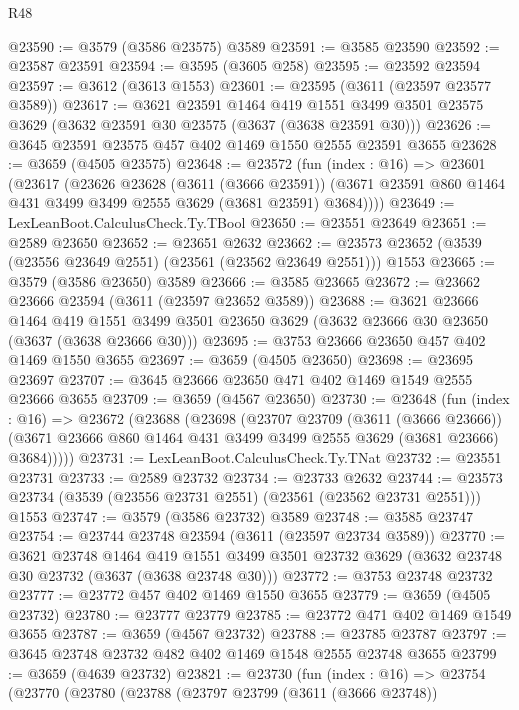 \begin{lexlean}{R48}
\begin{coremodule}
@23590 := @3579 (@3586 @23575) @3589
@23591 := @3585 @23590
@23592 := @23587 @23591
@23594 := @3595 (@3605 @258)
@23595 := @23592 @23594
@23597 := @3612 (@3613 @1553)
@23601 := @23595 (@3611 (@23597 @23577 @3589))
@23617 := @3621
    @23591
    @1464
    @419
    @1551
    @3499
    @3501
    @23575
    @3629
    (@3632 @23591 @30 @23575 (@3637 (@3638 @23591 @30)))
@23626 := @3645 @23591 @23575 @457 @402 @1469 @1550 @2555 @23591 @3655
@23628 := @3659 (@4505 @23575)
@23648 := @23572
    (fun (index : @16) =>
    @23601
      (@23617
        (@23626
          @23628
          (@3611 (@3666 @23591))
          (@3671 @23591 @860 @1464 @431 @3499 @3499 @2555 @3629 (@3681 @23591) @3684))))
@23649 := LexLeanBoot.CalculusCheck.Ty.TBool
@23650 := @23551 @23649
@23651 := @2589 @23650
@23652 := @23651 @2632
@23662 := @23573 @23652 (@3539 (@23556 @23649 @2551) (@23561 (@23562 @23649 @2551))) @1553
@23665 := @3579 (@3586 @23650) @3589
@23666 := @3585 @23665
@23672 := @23662 @23666 @23594 (@3611 (@23597 @23652 @3589))
@23688 := @3621
    @23666
    @1464
    @419
    @1551
    @3499
    @3501
    @23650
    @3629
    (@3632 @23666 @30 @23650 (@3637 (@3638 @23666 @30)))
@23695 := @3753 @23666 @23650 @457 @402 @1469 @1550 @3655
@23697 := @3659 (@4505 @23650)
@23698 := @23695 @23697
@23707 := @3645 @23666 @23650 @471 @402 @1469 @1549 @2555 @23666 @3655
@23709 := @3659 (@4567 @23650)
@23730 := @23648
    (fun (index : @16) =>
    @23672
      (@23688
        (@23698
          (@23707
            @23709
            (@3611 (@3666 @23666))
            (@3671 @23666 @860 @1464 @431 @3499 @3499 @2555 @3629 (@3681 @23666) @3684)))))
@23731 := LexLeanBoot.CalculusCheck.Ty.TNat
@23732 := @23551 @23731
@23733 := @2589 @23732
@23734 := @23733 @2632
@23744 := @23573 @23734 (@3539 (@23556 @23731 @2551) (@23561 (@23562 @23731 @2551))) @1553
@23747 := @3579 (@3586 @23732) @3589
@23748 := @3585 @23747
@23754 := @23744 @23748 @23594 (@3611 (@23597 @23734 @3589))
@23770 := @3621
    @23748
    @1464
    @419
    @1551
    @3499
    @3501
    @23732
    @3629
    (@3632 @23748 @30 @23732 (@3637 (@3638 @23748 @30)))
@23772 := @3753 @23748 @23732
@23777 := @23772 @457 @402 @1469 @1550 @3655
@23779 := @3659 (@4505 @23732)
@23780 := @23777 @23779
@23785 := @23772 @471 @402 @1469 @1549 @3655
@23787 := @3659 (@4567 @23732)
@23788 := @23785 @23787
@23797 := @3645 @23748 @23732 @482 @402 @1469 @1548 @2555 @23748 @3655
@23799 := @3659 (@4639 @23732)
@23821 := @23730
    (fun (index : @16) =>
    @23754
      (@23770
        (@23780
          (@23788
            (@23797
              @23799
              (@3611 (@3666 @23748))

\end{coremodule}
\end{lexlean}
